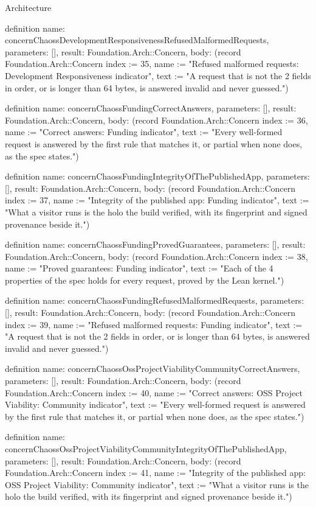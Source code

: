 \begin{lexlean}{Architecture}
\begin{semanticmodule}
definition{
  name: concernChaossDevelopmentResponsivenessRefusedMalformedRequests,
  parameters: [],
  result: Foundation.Arch::Concern,
  body: (record Foundation.Arch::Concern {index := 35, name := "Refused malformed requests: Development Responsiveness indicator", text := "A request that is not the 2 fields in order, or is longer than 64 bytes, is answered invalid and never guessed."})
}

definition{
  name: concernChaossFundingCorrectAnswers,
  parameters: [],
  result: Foundation.Arch::Concern,
  body: (record Foundation.Arch::Concern {index := 36, name := "Correct answers: Funding indicator", text := "Every well-formed request is answered by the first rule that matches it, or partial when none does, as the spec states."})
}

definition{
  name: concernChaossFundingIntegrityOfThePublishedApp,
  parameters: [],
  result: Foundation.Arch::Concern,
  body: (record Foundation.Arch::Concern {index := 37, name := "Integrity of the published app: Funding indicator", text := "What a visitor runs is the holo the build verified, with its fingerprint and signed provenance beside it."})
}

definition{
  name: concernChaossFundingProvedGuarantees,
  parameters: [],
  result: Foundation.Arch::Concern,
  body: (record Foundation.Arch::Concern {index := 38, name := "Proved guarantees: Funding indicator", text := "Each of the 4 properties of the spec holds for every request, proved by the Lean kernel."})
}

definition{
  name: concernChaossFundingRefusedMalformedRequests,
  parameters: [],
  result: Foundation.Arch::Concern,
  body: (record Foundation.Arch::Concern {index := 39, name := "Refused malformed requests: Funding indicator", text := "A request that is not the 2 fields in order, or is longer than 64 bytes, is answered invalid and never guessed."})
}

definition{
  name: concernChaossOssProjectViabilityCommunityCorrectAnswers,
  parameters: [],
  result: Foundation.Arch::Concern,
  body: (record Foundation.Arch::Concern {index := 40, name := "Correct answers: OSS Project Viability: Community indicator", text := "Every well-formed request is answered by the first rule that matches it, or partial when none does, as the spec states."})
}

definition{
  name: concernChaossOssProjectViabilityCommunityIntegrityOfThePublishedApp,
  parameters: [],
  result: Foundation.Arch::Concern,
  body: (record Foundation.Arch::Concern {index := 41, name := "Integrity of the published app: OSS Project Viability: Community indicator", text := "What a visitor runs is the holo the build verified, with its fingerprint and signed provenance beside it."})
}


\end{semanticmodule}
\end{lexlean}

